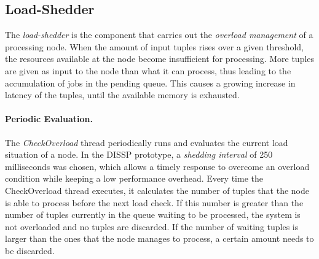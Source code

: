 \subsection*{Load-Shedder}

The \emph{load-shedder} is the component that carries out the \emph{overload management} of a
processing node. When the amount of input tuples rises over a given threshold, the resources available at
the node become insufficient for processing. More tuples are given as input to the node than
what it can process, thus leading to the accumulation of jobs in the pending queue. This causes a growing
increase in latency of the tuples, until the available memory is exhausted.
\vspace{-10pt}
\paragraph{Periodic Evaluation.}
The \emph{CheckOverload} thread periodically runs and evaluates the current load situation of a node.
In the DISSP prototype, a \emph{shedding interval} of 250 milliseconds was chosen, which allows a timely
response to overcome an overload condition while keeping a low performance overhead. Every time the
CheckOverload thread executes, it calculates the number of tuples that the node is able to process
before the next load check.
If this number is greater than the number of tuples currently in the queue waiting to be processed, the
system is not overloaded and no tuples are discarded. If the number of waiting tuples is larger than the
ones that the node manages to process, a certain amount needs to be discarded. 


